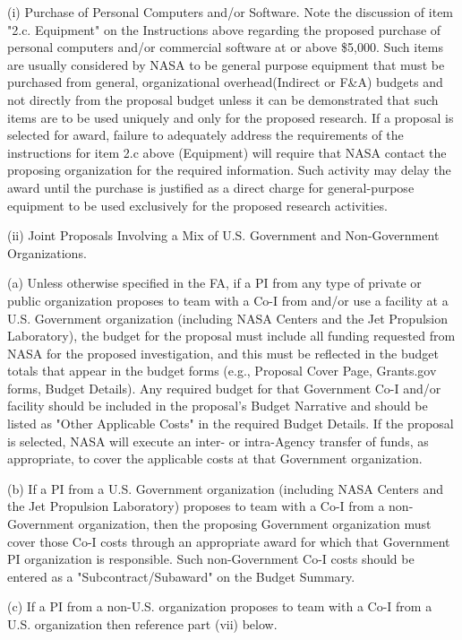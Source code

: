 \documentclass[12pt]{article}
\begin{document}
(i) Purchase of Personal Computers and/or Software. Note the
discussion of item "2.c. Equipment" on the Instructions above
regarding the proposed purchase of personal computers and/or
commercial software at or above \$5,000. Such items are usually
considered by NASA to be general purpose equipment that must be
purchased from general, organizational overhead(Indirect or F\&A)
budgets and not directly from the proposal budget unless it can be
demonstrated that such items are to be used uniquely and only for the
proposed research. If a proposal is selected for award, failure to
adequately address the requirements of the instructions for item 2.c
above (Equipment) will require that NASA contact the proposing
organization for the required information. Such activity may delay the
award until the purchase is justified as a direct charge for
general-purpose equipment to be used exclusively for the proposed
research activities.

(ii) Joint Proposals Involving a Mix of U.S. Government and
Non-Government Organizations.

(a) Unless otherwise specified in the FA, if a PI from any type of
private or public organization proposes to team with a Co-I from
and/or use a facility at a U.S. Government organization (including
NASA Centers and the Jet Propulsion Laboratory), the budget for the
proposal must include all funding requested from NASA for the proposed
investigation, and this must be reflected in the budget totals that
appear in the budget forms (e.g., Proposal Cover Page, Grants.gov
forms, Budget Details). Any required budget for that Government Co-I
and/or facility should be included in the proposal's Budget Narrative
and should be listed as "Other Applicable Costs" in the required
Budget Details. If the proposal is selected, NASA will execute an
inter- or intra-Agency transfer of funds, as appropriate, to cover the
applicable costs at that Government organization.

(b) If a PI from a U.S. Government organization (including NASA
Centers and the Jet Propulsion Laboratory) proposes to team with a
Co-I from a non-Government organization, then the proposing Government
organization must cover those Co-I costs through an appropriate award
for which that Government PI organization is responsible. Such
non-Government Co-I costs should be entered as a
"Subcontract/Subaward" on the Budget Summary.

(c) If a PI from a non-U.S. organization proposes to team with a Co-I
from a U.S. organization then reference part (vii) below.
\end{document}
